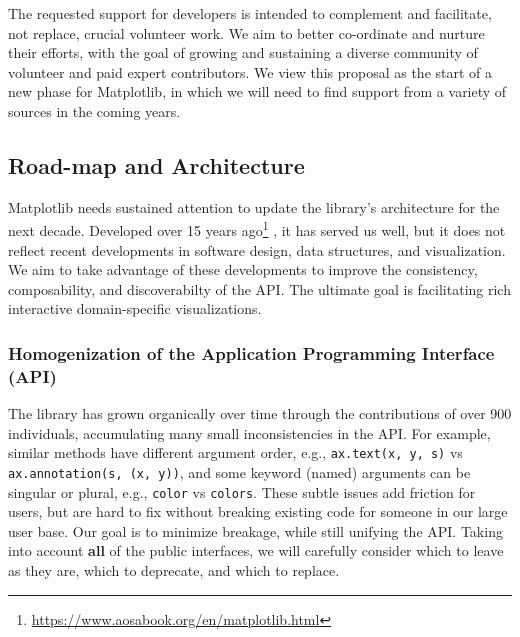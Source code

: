 \documentclass[12pt,letterpaper]{article}  %
\begin{document}
The requested support for developers is intended to complement and
facilitate, not replace, crucial volunteer work. We aim to better
co-ordinate and nurture their efforts, with the goal of growing and
sustaining a diverse community of volunteer and paid expert
contributors.  We view this proposal as the start of a new phase for
Matplotlib, in which we will need to find support from a variety of
sources in the coming years.



\subsection{Road-map and Architecture}

Matplotlib needs sustained attention to update the library's
architecture for the next decade.  Developed over 15 years
ago\footnote{\url{https://www.aosabook.org/en/matplotlib.html}}
\cite{Hunter:2007}, it has served us well, but it does not reflect
recent developments in software design, data structures, and
visualization. We aim to take advantage of these developments to
improve the consistency, composability, and discoverabilty of the
API. The ultimate goal is facilitating rich interactive
domain-specific visualizations.



\subsubsection{Homogenization of the Application Programming Interface (API)}
\label{sec:api_hom}
The library has grown organically over time through the contributions of over 900 individuals, accumulating many small inconsistencies in the API. For example, similar methods have different
argument order, e.g., \texttt{ax.text(x, y, s)} vs
\texttt{ax.annotation(s, (x, y))}, and some keyword (named) arguments can be
singular or plural, e.g., \texttt{color} vs \texttt{colors}.  These
subtle issues add friction for users, but are hard to fix without
breaking existing code for someone in our large user base.  Our goal is
to minimize breakage, while still unifying the API. Taking into account
\textbf{all} of the public interfaces, we will carefully consider which to leave as
they are, which to deprecate, and which to replace.
\end{document}
